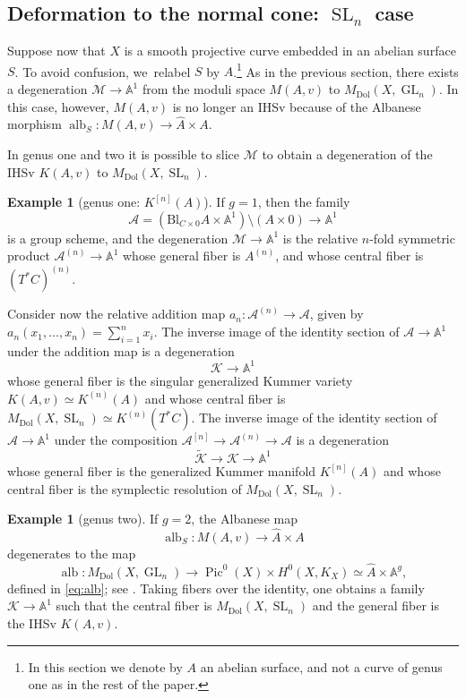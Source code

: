 \documentclass[JEP,XML,SOM,Unicode, NoEqCountersInSection,NoFloatCountersInSection,published]{cedram}
\let\mathcal\mathscr
\theoremstyle{definition}
\newtheorem{exa}[thm]{Example}
\newcommand{\Aff}{\mathbb{A}}
\newcommand{\alb}{\operatorname{alb}}
\newcommand{\Gl}{\operatorname{GL}}
\newcommand{\Sl}{\operatorname{SL}}
\newcommand{\Pic}{\operatorname{Pic}}
\newcommand{\MDolGl}{{M}_{\mathrm{Dol}}(X, \Gl_n)}
\newcommand{\MDolSl}{{M}_{\mathrm{Dol}}(X, \Sl_n)}
\newcommand{\KummA}{K(A, v)}
\begin{document}
\subsection{Deformation to the normal cone: $\Sl_n$ case}
Suppose now that $X$ is a smooth projective curve embedded in an abelian surface $S$. To avoid confusion, we~relabel $S$ by $A$.\footnote{In this section we denote by $A$ an abelian surface, and not a curve of genus one as in the rest of the paper.} As in the previous section, there exists a degeneration $\mathcal{M} \to \Aff^1$ from the moduli space $M(A,v)$ to $\MDolGl$. In this case, however, $M(A,v)$ is no longer an IHSv because of the Albanese morphism
$\alb_S\colon M(A,v) \to \hat{A} \times A $.

In genus one and two it is possible to slice $\mathcal{M}$ to obtain a degeneration of the IHSv $\KummA$ to $\MDolSl$.
\begin{exa}[genus one: $K^{[n]}(A)$]\label{genusonekummer}
If $g=1$, then the family
\[
\mathcal{A}=\left(\mathrm{Bl}_{C\times 0}A\times \Aff^1\right)\setminus \left( A\times 0\right)\to \Aff^1
\]
is a group scheme, and the degeneration $\mathcal{M} \to \Aff^1$ is the relative $n$-fold symmetric product $\mathcal{A}^{(n)} \to \Aff^1$ whose general fiber is $A^{(n)}$, and whose central fiber is $(T^*C)^{(n)}$.

Consider now the relative addition map $a_n\colon \mathcal{A}^{(n)} \to \mathcal{A}$, given by $a_n(x_1, \ldots, x_n)= \sum_{i=1}^{n}x_i$. The inverse image of the identity section of $\mathcal{A} \to \Aff^1$ under the addition map is a degeneration
\[
\mathcal{K} \to \Aff^1
\]
whose general fiber is the singular generalized Kummer variety $\KummA \simeq K^{(n)}(A)$ and whose central fiber is $\MDolSl \simeq K^{(n)}(T^*C)$. The inverse image of the identity section of $\mathcal{A} \to \Aff^1$ under the composition $\mathcal{A}^{[n]} \to \mathcal{A}^{(n)} \to \mathcal{A}$ is a degeneration
\[
\widetilde{\mathcal{K}} \to \mathcal{K} \to \Aff^1
\]
whose general fiber is the generalized Kummer manifold $K^{[n]}(A)$ and whose central fiber is the symplectic resolution of $\MDolSl$.
\end{exa}
\begin{exa}[genus two]\label{ex:genus2}
If $g=2$, the Albanese map \cite{Yoshioka2001}
\[
\alb_S\colon M(A,v) \to \hat{A} \times A
\]
degenerates to the map
\[
\alb\colon \MDolGl \to \Pic^0(X) \times H^0(X, K_X) \simeq \hat{A} \times \Aff^{g},
\]
defined in \eqref{eq:alb}; see \cite[\S 4]{deCataldoMaulikShen2020}.
Taking fibers over the identity, one obtains a family \hbox{$\mathcal{K}\!\to\! \Aff^1$} such that the central fiber is $\MDolSl$ and the general fiber is the IHSv $\KummA$.
\end{exa}
\end{document}
